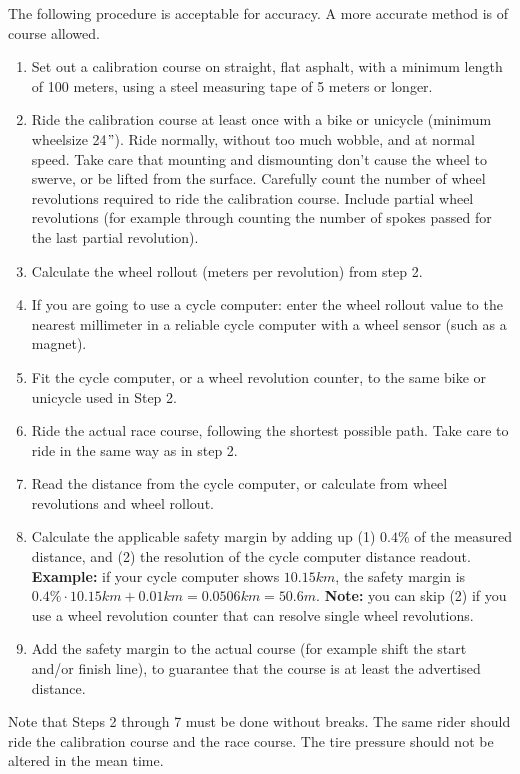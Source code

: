 The following procedure is acceptable for accuracy.
A more accurate method is of course allowed.
\begin{enumerate}
\item Set out a calibration course on straight, flat asphalt, with a minimum length of 100 meters, using a steel measuring tape of 5 meters or longer.
\item Ride the calibration course at least once with a bike or unicycle (minimum wheelsize 24$"$).
Ride normally, without too much wobble, and at normal speed.
Take care that mounting and dismounting don't cause the wheel to swerve, or be lifted from the surface.
Carefully count the number of wheel revolutions required to ride the calibration course.
Include partial wheel revolutions (for example through counting the number of spokes passed for the last partial revolution).
\item Calculate the wheel rollout (meters per revolution) from step 2.
\item If you are going to use a cycle computer: enter the wheel rollout value to the nearest millimeter in a reliable cycle computer with a wheel sensor (such as a magnet).
\item Fit the cycle computer, or a wheel revolution counter, to the same bike or unicycle used in Step 2.
\item Ride the actual race course, following the shortest possible path.
Take care to ride in the same way as in step 2.
\item Read the distance from the cycle computer, or calculate from wheel revolutions and wheel rollout.
\item Calculate the applicable safety margin by adding up (1) $0.4\%$ of the measured distance, and (2) the resolution of the cycle computer distance readout.
\textbf{Example:} if your cycle computer shows $10.15\unit{km}$, the safety margin is $0.4\% \cdot 10.15\unit{km} + 0.01\unit{km} = 0.0506\unit{km} = 50.6\unit{m}$.
\textbf{Note:} you can skip (2) if you use a wheel revolution counter that can resolve single wheel revolutions.
\item Add the safety margin to the actual course (for example shift the start and/or finish line), to guarantee that the course is at least the advertised distance.
\end{enumerate}
Note that Steps 2 through 7 must be done without breaks.
The same rider should ride the calibration course and the race course.
The tire pressure should not be altered in the mean time.

